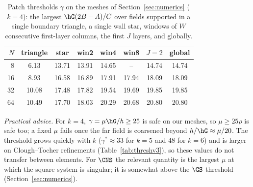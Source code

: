 \begin{table}[t]
\centering\small
\caption{Patch thresholds $\gamma$ on the meshes of Section~\ref{sec:numerics} ($k=4$): the largest $\hG(2B-A)/C$ over fields supported in a single boundary triangle, a single wall star, windows of $W$ consecutive first-layer columns, the first $J$ layers, and globally.}\label{tab:patch}
\begin{tabular}{rccccccc}
\toprule
$N$ & triangle & star & win2 & win4 & win8 & $J=2$ & global\\
\midrule
8 & 6.13 & 13.71 & 13.91 & 14.65 & -- & 14.74 & 14.74\\
16 & 8.93 & 16.58 & 16.89 & 17.91 & 17.94 & 18.09 & 18.09\\
32 & 10.08 & 17.48 & 17.82 & 19.54 & 19.69 & 19.85 & 19.85\\
64 & 10.49 & 17.70 & 18.03 & 20.29 & 20.68 & 20.80 & 20.80\\
\bottomrule
\end{tabular}
\end{table}

\emph{Practical advice.} For $k=4$, $\gamma=\mu\hG/h\ge25$ is safe on our meshes, so $\mu\ge25\rho$ is safe too; a fixed $\mu$ fails once the far field is coarsened beyond $h/\hG\approx\mu/20$. The threshold grows quickly with $k$ ($\gamma^\ast\approx33$ for $k=5$ and $48$ for $k=6$) and is larger on Clough--Tocher refinements (Table~\ref{tab:threshv3}), so these values do not transfer between elements. For $\CNS$ the relevant quantity is the largest $\mu$ at which the square system is singular; it is somewhat above the $\GS$ threshold (Section~\ref{sec:numerics}).
